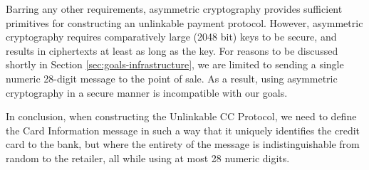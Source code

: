 Barring any other requirements, asymmetric cryptography provides sufficient primitives for constructing an unlinkable payment protocol.
However, asymmetric cryptography requires comparatively large (2048 bit) keys to be secure, and results in ciphertexts at least as long as the key.
For reasons to be discussed shortly in Section \ref{sec:goals-infrastructure}, we are limited to sending a single numeric 28-digit message to the point of sale.
As a result, using asymmetric cryptography in a secure manner is incompatible with our goals.

In conclusion, when constructing the Unlinkable CC Protocol, we need to define the Card Information message in such a way that it uniquely identifies the credit card to the bank,
  but where the entirety of the message is indistinguishable from random to the retailer,
  all while using at most 28 numeric digits.
